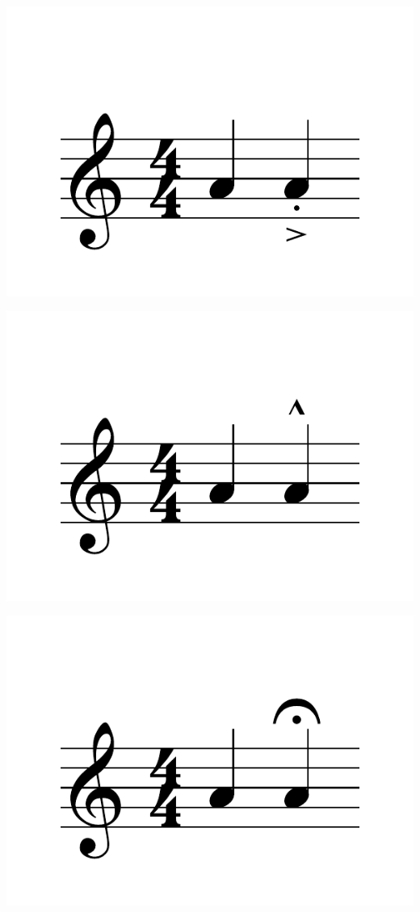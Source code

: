 \documentclass{article}
\begin{document}
\includegraphics[scale=0.5]{figures_tests/pdf/skern/articulations4.pdf}

\includegraphics[scale=0.5]{figures_tests/pdf/skern/articulations5.pdf}

\includegraphics[scale=0.5]{figures_tests/pdf/skern/articulations6.pdf}
\end{document}
